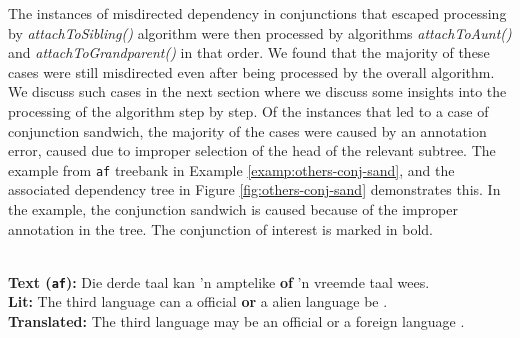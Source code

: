 The instances of misdirected dependency in conjunctions that escaped processing by \textit{attachToSibling()} algorithm were then processed by algorithms \textit{attachToAunt()} and \textit{attachToGrandparent()} in that order. We found that the majority of these cases were still misdirected even after being processed by the overall algorithm. We discuss such cases in the next section where we discuss some insights into the processing of the algorithm step by step. Of the instances that led to a case of conjunction sandwich, the majority of the cases were caused by an annotation error, caused due to improper selection of the head of the relevant subtree. The example from \verb|af| treebank in Example \ref{examp:others-conj-sand}, and the associated dependency tree in Figure \ref{fig:others-conj-sand} demonstrates this. In the example, the conjunction sandwich is caused because of the improper annotation in the tree. The conjunction of interest is marked in bold.

\begin{example}
\label{examp:others-conj-sand}
\textbf{ }\\
\textbf{Text (\texttt{af}):} Die derde taal kan 'n amptelike \textbf{of} 'n vreemde taal wees.\\
\textbf{Lit:} The third language can a official \textbf{or} a alien language be .\\ 
\textbf{Translated:} The third language may be an official or a foreign language .
\end{example}

